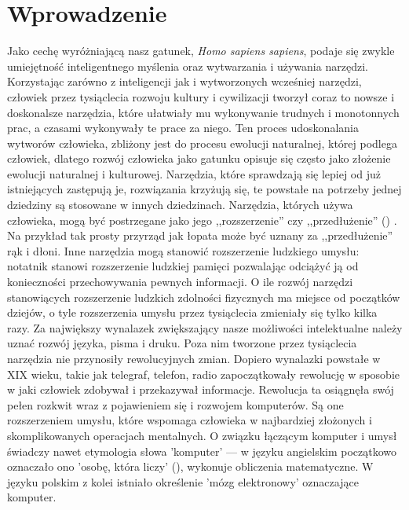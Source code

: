 \chapter{Wprowadzenie}
Jako cechę wyróżniającą nasz gatunek, \textit{Homo sapiens sapiens},  podaje się zwykle umiejętność inteligentnego myślenia oraz wytwarzania i używania narzędzi. Korzystając zarówno z inteligencji jak i wytworzonych wcześniej narzędzi, człowiek przez tysiąclecia rozwoju kultury i cywilizacji tworzył coraz to nowsze i doskonalsze narzędzia, które ułatwiały mu wykonywanie trudnych i monotonnych prac, a czasami wykonywały te prace za niego. Ten proces udoskonalania wytworów człowieka, zbliżony jest do procesu ewolucji naturalnej, której podlega człowiek, dlatego rozwój człowieka jako gatunku opisuje się często jako złożenie ewolucji naturalnej i kulturowej. Narzędzia, które sprawdzają się lepiej od już istniejących zastępują je, rozwiązania krzyżują się, te powstałe na potrzeby jednej dziedziny są stosowane w innych dziedzinach.
Narzędzia, których używa człowieka, mogą być postrzegane jako jego ,,rozszerzenie'' czy ,,przedłużenie'' () \cite{ANAL:ANAL096}. Na przykład tak prosty przyrząd jak łopata może być uznany za ,,przedłużenie'' rąk i dłoni. Inne narzędzia mogą stanowić rozszerzenie ludzkiego umysłu: notatnik stanowi rozszerzenie ludzkiej pamięci pozwalając odciążyć ją od konieczności przechowywania pewnych informacji. O ile rozwój narzędzi stanowiących rozszerzenie ludzkich zdolności fizycznych ma miejsce od początków dziejów, o tyle rozszerzenia umysłu przez tysiąclecia zmieniały się tylko kilka razy. Za największy wynalazek zwiększający nasze możliwości intelektualne należy uznać rozwój języka, pisma i druku. Poza nim tworzone przez tysiąclecia narzędzia nie przynosiły rewolucyjnych zmian. Dopiero wynalazki powstałe w XIX wieku, takie jak telegraf, telefon, radio zapoczątkowały rewolucję w sposobie w jaki człowiek zdobywał i przekazywał informacje. Rewolucja ta osiągnęła swój pełen rozkwit wraz z pojawieniem się i rozwojem komputerów. Są one rozszerzeniem umysłu, które wspomaga człowieka w najbardziej złożonych i skomplikowanych operacjach mentalnych. O związku łączącym komputer i umysł świadczy nawet etymologia słowa 'komputer' --- w języku angielskim początkowo oznaczało ono 'osobę, która liczy' (), wykonuje obliczenia matematyczne. W języku polskim z kolei istniało określenie 'mózg elektronowy' oznaczające komputer.

